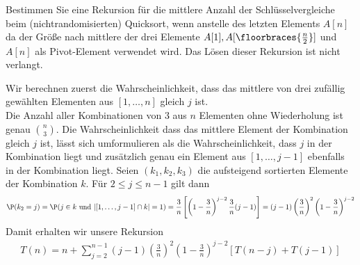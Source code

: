 
\begin{exercise}

Bestimmen Sie eine Rekursion für die mittlere Anzahl der Schlüsselvergleiche beim
(nichtrandomisierten) Quicksort, wenn anstelle des letzten Elements $A[n]$ da
der Größe nach mittlere der drei Elemente $A[1],A[\floorbraces{\frac{n}{2}}]$
und $A[n]$ als Pivot-Element verwendet wird. Das Lösen dieser Rekursion ist nicht
verlangt.

\end{exercise}



\begin{solution}

Wir berechnen zuerst die Wahrscheinlichkeit, dass das mittlere von drei zufällig
gewählten Elementen aus $[1,\dots,n]$ gleich $j$ ist. \\
Die Anzahl aller Kombinationen von $3$ aus $n$ Elementen ohne Wiederholung ist genau $\binom{n}{3}$.
Die Wahrscheinlichkeit dass das mittlere Element der Kombination gleich $j$ ist,
lässt sich umformulieren als die Wahrscheinlichkeit, dass $j$ in der Kombination liegt
und zusätzlich genau ein Element aus $[1,\dots,j-1]$ ebenfalls in der Kombination liegt.
Seien $(k_1,k_2,k_3)$ die aufsteigend sortierten Elemente der Kombination $k$.
Für $2 \leq j \leq n - 1$ gilt dann
\begin{align*}
  \P(k_2 = j) = \P(j \in k \text{ und } |[1,\dots,j-1]\cap k| = 1)
  = \frac{3}{n}\left[\left(1- \frac{3}{n}\right)^{j-2}\frac{3}{n}(j-1)\right]
  =(j-1)\left(\frac{3}{n}\right)^{2}\left(1- \frac{3}{n}\right)^{j-2}
\end{align*}
Damit erhalten wir unsere Rekursion
\begin{align*}
  T(n) = n + \sum_{j=2}^{n-1}(j-1)\left(\frac{3}{n}\right)^{2}\left(1- \frac{3}{n}\right)^{j-2}
  [T(n-j) + T(j - 1)]
\end{align*}
\end{solution}


